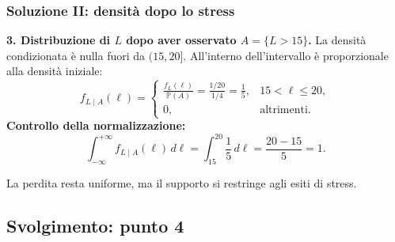 \documentclass[handout]{beamer}%
\providecommand{\Prob}{\mathbb{P}}
\providecommand{\1}{\mathbf{1}}
\providecommand{\QTR}[2]{\csname #1\endcsname{#2}}
\begin{document}
\begin{frame}%
\frametitle{Soluzione II: densit\`{a} dopo lo stress}
%


\textbf{3. Distribuzione di $L$ dopo aver osservato $A=\{L>15\}$.} \medskip La
densit\`{a} condizionata \`{e} nulla fuori da $(15,20]$. All'interno
dell'intervallo \`{e} proporzionale alla densit\`{a} iniziale:
\[
f_{L\mid A}(\ell)=
\begin{cases}
\displaystyle\frac{f_{L}(\ell)}{\Prob(A)} =\frac{1/20}{1/4}=\frac15, &
15<\ell\leq20,\\[2mm]%
0, & \text{altrimenti}.
\end{cases}
\]
\textbf{Controllo della normalizzazione:}
\[
\int_{-\infty}^{+\infty}f_{L\mid A}(\ell)\,d\ell=\int_{15}^{20}\frac
15\,d\ell=\frac{20-15}{5}=1.
\]


\begin{center}
\textcolor{light-blue}{La perdita resta uniforme, ma il supporto si restringe agli esiti di stress.}
\end{center}%

\end{frame}%


\subsection{Svolgimento: punto 4}%
\end{document}

